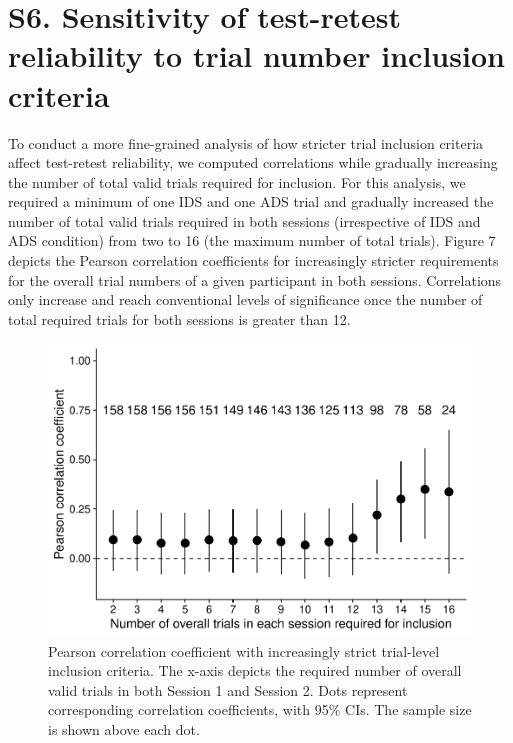 \documentclass[
  english,
  man, donotrepeattitle,floatsintext]{apa6}
\begin{document}
\newpage

\hypertarget{s6.-sensitivity-of-test-retest-reliability-to-trial-number-inclusion-criteria}{%
\section{S6. Sensitivity of test-retest reliability to trial number inclusion criteria}\label{s6.-sensitivity-of-test-retest-reliability-to-trial-number-inclusion-criteria}}

To conduct a more fine-grained analysis of how stricter trial inclusion criteria affect test-retest reliability, we computed correlations while gradually increasing the number of total valid trials required for inclusion.
For this analysis, we required a minimum of one IDS and one ADS trial and gradually increased the number of total valid trials required in both sessions (irrespective of IDS and ADS condition) from two to 16 (the maximum number of total trials).
Figure 7 depicts the Pearson correlation coefficients for increasingly stricter requirements for the overall trial numbers of a given participant in both sessions.
Correlations only increase and reach conventional levels of significance once the number of total required trials for both sessions is greater than 12.

\begin{figure}
\centering
\includegraphics{MB1T_supplement_files/figure-latex/sfig7-1.pdf}
\caption{\label{fig:sfig7}Pearson correlation coefficient with increasingly strict trial-level inclusion criteria. The x-axis depicts the required number of overall valid trials in both Session 1 and Session 2. Dots represent corresponding correlation coefficients, with 95\% CIs. The sample size is shown above each dot.}
\end{figure}
\end{document}
